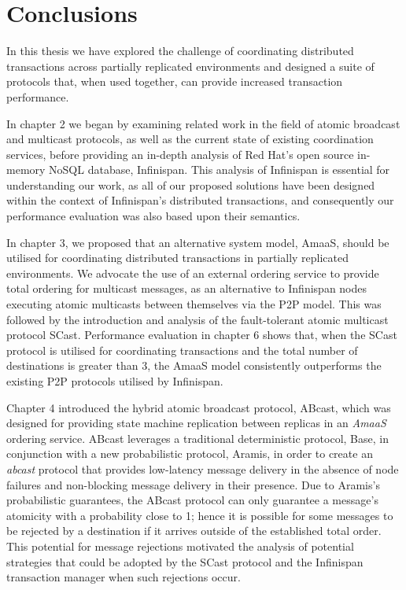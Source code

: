 \chapter{Conclusions}

    \graphicspath{{Chapter7-Conclusions/Figs/Vector/}{Chapter3-Conclusions/Figs/}}

In this thesis we have explored the challenge of coordinating distributed transactions across partially replicated environments and designed a suite of protocols that, when used together, can provide increased transaction performance. 

In chapter 2 we began by examining related work in the field of atomic broadcast and multicast protocols, as well as the current state of existing coordination services, before providing an in-depth analysis of Red Hat's open source in-memory NoSQL database, Infinispan.  This analysis of Infinispan is essential for understanding our work, as all of our proposed solutions have been designed within the context of Infinispan's distributed transactions, and consequently our performance evaluation was also based upon their semantics.

In chapter 3, we proposed that an alternative system model, \textsf{AmaaS}, should be utilised for coordinating distributed transactions in partially replicated environments.  We advocate the use of an external ordering service to provide total ordering for multicast messages, as an alternative to Infinispan nodes executing atomic multicasts between themselves via the P2P model.  This was followed by the introduction and analysis of the fault-tolerant atomic multicast protocol \textsf{SCast}.  Performance evaluation in chapter 6 shows that, when the \textsf{SCast} protocol is utilised for coordinating transactions and the total number of destinations is greater than 3, the \textsf{AmaaS} model consistently outperforms the existing P2P protocols utilised by Infinispan.

Chapter 4 introduced the hybrid atomic broadcast protocol, \textsf{ABcast}, which was designed for providing state machine replication between replicas in an \emph{AmaaS} ordering service.  \textsf{ABcast} leverages a traditional deterministic protocol, \textsf{Base}, in conjunction with a new probabilistic protocol, \textsf{Aramis}, in order to create an \emph{abcast} protocol that provides low-latency message delivery in the absence of node failures and non-blocking message delivery in their presence.  Due to \textsf{Aramis}'s probabilistic guarantees, the \textsf{ABcast} protocol can only guarantee a message's atomicity with a probability close to 1; hence it is possible for some messages to be rejected by a destination if it arrives outside of the established total order.  This potential for message rejections motivated the analysis of potential strategies that could be adopted by the \textsf{SCast} protocol and the Infinispan transaction manager when such rejections occur.  

